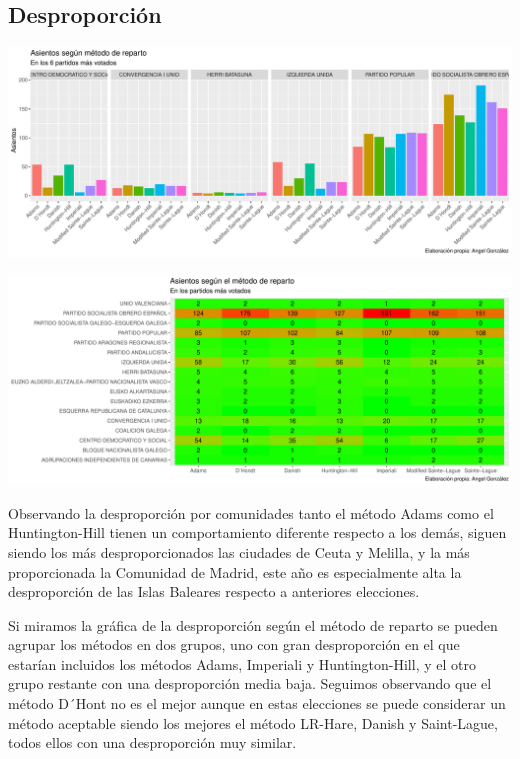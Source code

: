 \documentclass[12pt,a4paper,]{book}
\numberwithin{dummy}{section}
\theoremstyle{ocrenumbox}
\theoremstyle{blacknumex}
\theoremstyle{blacknumbox}
\theoremstyle{ocrenum}
\theoremstyle{ocrenum}
\begin{document}
\hypertarget{desproporciuxf3n-7}{%
\subsection{Desproporción}\label{desproporciuxf3n-7}}

\begin{center}\includegraphics[width=1\linewidth]{figurasR/unnamed-chunk-95-1} \end{center}

\begin{center}\includegraphics[width=1\linewidth]{figurasR/unnamed-chunk-95-2} \end{center}

Observando la desproporción por comunidades tanto el método Adams como
el Huntington-Hill tienen un comportamiento diferente respecto a los
demás, siguen siendo los más desproporcionados las ciudades de Ceuta y
Melilla, y la más proporcionada la Comunidad de Madrid, este año es
especialmente alta la desproporción de las Islas Baleares respecto a
anteriores elecciones.

Si miramos la gráfica de la desproporción según el método de reparto se
pueden agrupar los métodos en dos grupos, uno con gran desproporción en
el que estarían incluidos los métodos Adams, Imperiali y
Huntington-Hill, y el otro grupo restante con una desproporción media
baja. Seguimos observando que el método D´Hont no es el mejor aunque en
estas elecciones se puede considerar un método aceptable siendo los
mejores el método LR-Hare, Danish y Saint-Lague, todos ellos con una
desproporción muy similar.
\end{document}
